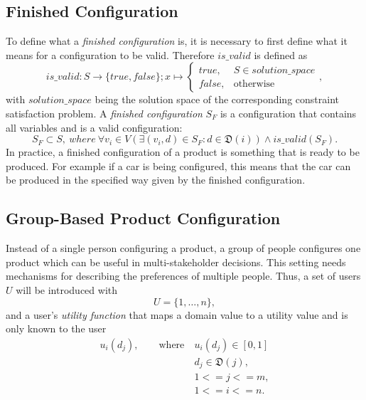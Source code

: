 \subsection{Finished Configuration}
To define what a \emph{finished configuration} is, it is necessary to first define what it means for a configuration to be valid. Therefore $is\_valid$ is defined as
\begin{equation} \label{eq:Foundations:ProductConfiguration:IsValid}
    is\_valid : S \to \{true, false\}; x \mapsto 
    \begin{cases}
        true, & S \in solution\_space \\
        false, & \text{otherwise}
    \end{cases},
\end{equation}
with $solution\_space$ being the solution space of the corresponding constraint satisfaction problem. A \emph{finished configuration} $S_F$ is a configuration that contains all variables and is a valid configuration:
\begin{equation} \label{eq:Foundations:ProductConfiguration:FinishedConfiguration}
    S_F \subset S,\ where \ \forall v_i \in V (\exists (v_i, d) \in S_F : d \in \mathfrak{D}(i)) \land is\_valid(S_F).
\end{equation}
In practice, a finished configuration of a product is something that is ready to be produced. For example if a car is being configured, this means that the car can be produced in the specified way given by the finished configuration.


\subsection{Group-Based Product Configuration}
\label{sec:Foundations:GroupBasedProductConfiguration}

Instead of a single person configuring a product, a group of people configures one product which can be useful in multi-stakeholder decisions. This setting needs mechanisms for describing the preferences of multiple people. Thus, a set of users $U$ will be introduced with
\begin{equation}\label{eq:Foundations:ProductConfiguration:Users}
    U = \{1, \dotsc, n\},
\end{equation}
and a user's \emph{utility function} that maps a domain value to a utility value and is only known to the user
\begin{equation}
    \begin{split}
        u_i(d_j), \qquad \text{where}\ & u_i(d_j) \in [0,1] \\
        & d_j \in  \mathfrak{D}(j),\\
        & 1 <= j <= m, \\
        & 1 <= i <= n.
    \end{split}
\end{equation}

